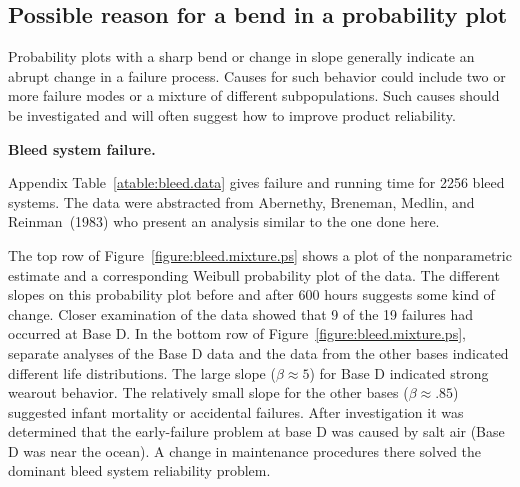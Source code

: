 \subsection{Possible reason for a bend in a probability plot}
Probability plots with a sharp bend or change in slope generally
indicate an abrupt change in a failure process.  Causes for such
behavior could include two or more failure modes or a mixture of
different subpopulations. Such causes should be investigated and
will often suggest how to improve product reliability.
\begin{example}
{\bf Bleed system failure.}
\begin{sidewaysfigure}
\caption{Bleed system data: (NW) Linear plot of the cdf, (NE) Weibull probability plot 
for all bases, (SW) Weibull probability plots for Base D alone,
(SE) Weibull plot for all bases except Base D.}
\label{figure:bleed.mixture.ps}
\end{sidewaysfigure}
Appendix Table~\ref{atable:bleed.data} gives failure and running time for 2256
bleed systems. The data were abstracted from Abernethy, Breneman,
Medlin, and Reinman~(1983) who present an analysis similar to
the one done here.

The top row of Figure~\ref{figure:bleed.mixture.ps} shows a plot of
the nonparametric estimate and a corresponding Weibull probability
plot of the data. The
different slopes on this probability plot before and after 600 hours suggests some kind of
change. Closer examination of the data showed that 9 of the 19
failures had occurred at Base D. In the bottom row of 
Figure~\ref{figure:bleed.mixture.ps}, separate analyses of the Base D data
and the data from the other bases indicated different life
distributions. The large slope ($\beta \approx 5$) for Base D indicated
strong wearout behavior.  
The relatively small slope for the other bases ($\beta
\approx .85$) suggested infant mortality or accidental failures. After
investigation it was determined that the early-failure
problem at base D was caused
by salt air (Base D was near the ocean). A change in maintenance
procedures there solved the dominant bleed system reliability problem.
\end{example}

